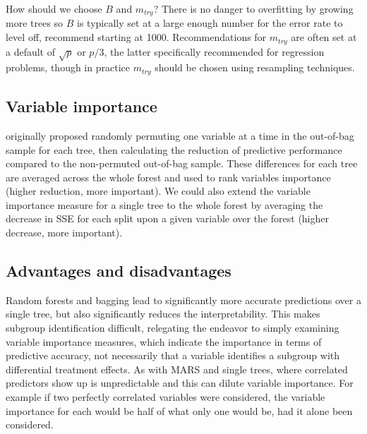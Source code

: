 \documentclass[12pt]{article}
\begin{document}
How should we choose $B$ and $m_{try}$? There is no danger to overfitting by growing more trees so $B$ is typically set at a large enough number for the error rate to level off, \textcite{apm} recommend starting at 1000. Recommendations for $m_{try}$ are often set at a default of $\sqrt{p}$ or $p/3$, the latter specifically recommended for regression problems, though in practice $m_{try}$ should be chosen using resampling techniques. 


\subsection{Variable importance} %
\label{sub:variable_importance_rf}

\textcite{rf} originally proposed randomly permuting one variable at a time in the out-of-bag sample for each tree, then calculating the reduction of predictive performance compared to the non-permuted out-of-bag sample. These differences for each tree are averaged across the whole forest and used to rank variables importance (higher reduction, more important). We could also extend the variable importance measure for a single tree to the whole forest by averaging the decrease in SSE for each split upon a given variable over the forest (higher decrease, more important).


\subsection{Advantages and disadvantages} %
\label{sub:advantages_and_disadvantages_rf}

Random forests and bagging lead to significantly more accurate predictions over a single tree, but also significantly reduces the interpretability. This makes subgroup identification difficult, relegating the endeavor to simply examining variable importance measures, which indicate the importance in terms of predictive accuracy, not necessarily that a variable identifies a subgroup with differential treatment effects. As with MARS and single trees, where correlated predictors show up is unpredictable and this can dilute variable importance. For example if two perfectly correlated variables were considered, the variable importance for each would be half of what only one would be, had it alone been considered.

\end{document}
